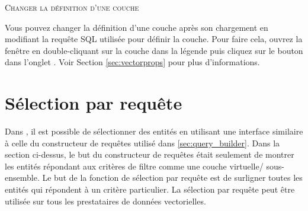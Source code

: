\begin{Tip}\caption{\textsc{Changer la définition d'une couche}}
Vous pouvez changer la définition d'une couche après son chargement en modifiant la requête SQL utilisée pour définir la couche. Pour faire cela, ouvrez la fenêtre  en double-cliquant sur la couche dans la légende puis cliquez sur le bouton  dans l'onglet . Voir Section \ref{sec:vectorprops} pour plus d'informations.
\end{Tip}

\section{Sélection par requête}\label{sec:select_by_query}

Dans \qg, il est possible de sélectionner des entités en utilisant une interface similaire à celle du constructeur de requêtes utilisé dans \ref{sec:query_builder}. Dans la section ci-dessus, le but du constructeur de requêtes était seulement de montrer les entités répondant aux critères de filtre comme une couche virtuelle/ sous-ensemble. Le but de la fonction de sélection par requête est de surligner toutes les entités qui répondent à un critère particulier. La sélection par requête peut être utilisée sur tous les prestataires de données vectorielles.

